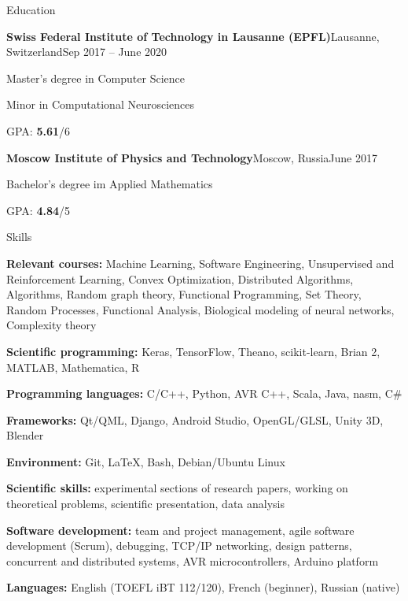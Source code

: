\documentclass{resume} %
\begin{document}
\begin{rSection}{Education}
\hspace{-1em}
\begin{rSubsection}{\bf Swiss Federal Institute of Technology in Lausanne (EPFL)}{}{Lausanne, Switzerland}{Sep 2017 -- June 2020}
\item Master's degree in Computer Science
\item Minor in Computational Neurosciences
\item GPA: {\bf 5.61}/6
\end{rSubsection}

\begin{rSubsection}{\bf Moscow Institute of Physics and Technology}{}{Moscow, Russia}{June 2017}
\item Bachelor's degree im Applied Mathematics
\item GPA: {\bf 4.84}/5
\end{rSubsection}
\end{rSection}

\begin{rSection}{Skills}
	\vspace{-1em}
	\item {\bf Relevant courses:} Machine Learning, Software Engineering, {\small Unsupervised and Reinforcement Learning, Convex Optimization, Distributed Algorithms, Algorithms, Random graph theory, Functional Programming, Set Theory, Random Processes, Functional Analysis, Biological modeling of neural networks, Complexity theory}
	\item {\bf Scientific programming:} Keras, TensorFlow, Theano, scikit-learn, Brian 2, MATLAB, Mathematica, R
	\item {\bf Programming languages:} C/C++, Python, AVR C++, Scala, Java, nasm, C\#
	\item {\bf Frameworks:} Qt/QML, Django, Android Studio, OpenGL/GLSL, Unity 3D, Blender
	\item {\bf Environment:} Git, \LaTeX, Bash, Debian/Ubuntu Linux
	\item {\bf Scientific skills:} experimental sections of research papers, working on theoretical problems, scientific presentation, data analysis
	\item {\bf Software development:} team and project management, agile software development (Scrum), debugging, TCP/IP networking, design patterns, concurrent and distributed systems, AVR microcontrollers, Arduino platform
	\item {\bf Languages:} English (TOEFL iBT 112/120), French (beginner), Russian (native)
\end{rSection}
\end{document}
